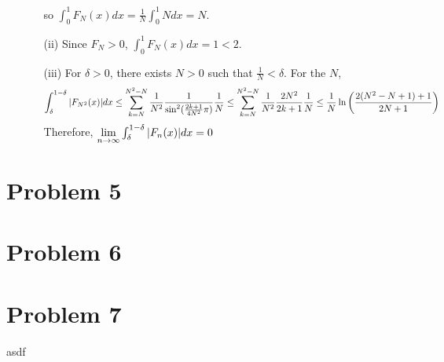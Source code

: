 \documentclass{article}
\begin{document}
\begin{enumerate}
\begin{enumerate}
so $\int_0^1 F_N(x) dx = \frac{1}{N}\int_0^1 N dx = N$.
\item[(ii)] Since $F_N>0$, $\int_0^1 F_N(x) dx = 1 < 2$.
\item[(iii)] For $\delta>0$, there exists $N>0$ such that $\frac{1}{N}< \delta$. For the $N$,
\begin{equation*}
\int_\delta^{1-\delta} \abs{F_{N^2}(x)} dx \leq \sum\limits_{k=N}^{N^2-N}\frac{1}{N^2}\frac{1}{\sin^2(\frac{2k+1}{4N^2}\pi)}\frac{1}{N} \leq \sum\limits_{k=N}^{N^2-N}\frac{1}{N^2}\frac{2N^2}{2k+1}\frac{1}{N} \leq \frac{1}{N}\ln\left(\frac{2(N^2-N+1)+1}{2N+1}\right)
\end{equation*}
Therefore, $\lim\limits_{n\rightarrow \infty}\int_\delta^{1-\delta}\abs{F_n(x)}dx=0$
\end{enumerate}
\end{enumerate}
\section*{Problem 5}

\section*{Problem 6}

\section*{Problem 7}
asdf
\end{document}
